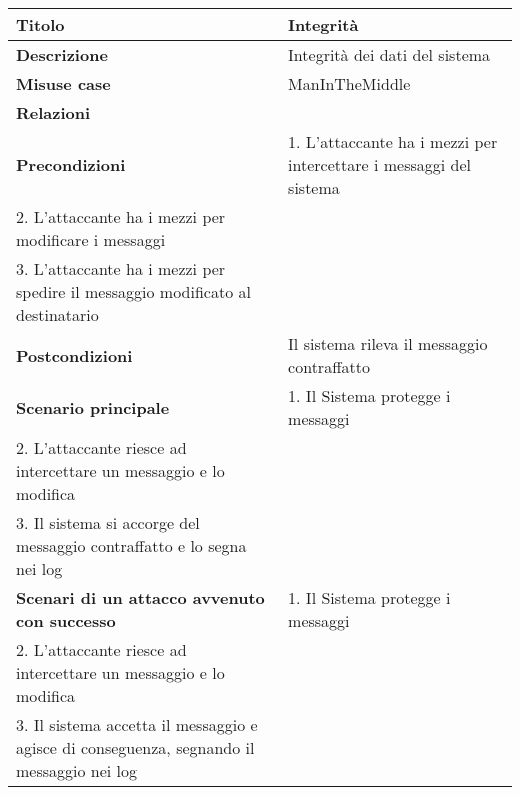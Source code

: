 \begin{tabular} {|P{4cm}|P{13cm}|}
\hline
\textbf{Titolo} & Integrità\\
\hline
  \textbf{Descrizione} & Integrità dei dati del sistema\\
\hline
  \textbf{Misuse case} & ManInTheMiddle\\
\hline
  \textbf{Relazioni} &\\
\hline
  \textbf{Precondizioni} & 1. L'attaccante ha i mezzi per intercettare i messaggi del sistema \\ 2. L'attaccante ha i mezzi per modificare i messaggi \\ 3. L'attaccante ha i mezzi per spedire il messaggio modificato al destinatario\\
\hline
  \textbf{Postcondizioni} & Il sistema rileva il messaggio contraffatto\\
\hline
  \textbf{Scenario principale} & 1. Il Sistema protegge i messaggi \\ 2. L'attaccante riesce ad intercettare un messaggio e lo modifica \\ 3. Il sistema si accorge del messaggio contraffatto e lo segna nei log\\
\hline
  \textbf{Scenari di un attacco avvenuto con successo} & 1. Il Sistema protegge i messaggi \\ 2. L'attaccante riesce ad intercettare un messaggio e lo modifica \\ 3. Il sistema accetta il messaggio e agisce di conseguenza, segnando il messaggio nei log\\
\hline
\end{tabular}
\\

